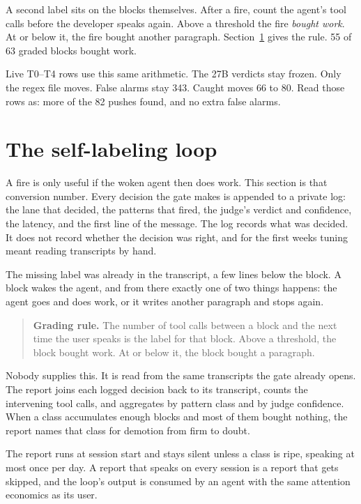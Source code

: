 A second label sits on the blocks themselves. After a fire, count
the agent's tool calls before the developer speaks again. Above a
threshold the fire \emph{bought work}. At or below it, the fire
bought another paragraph. Section~\ref{sec:loop} gives the rule.
55 of 63 graded blocks bought work.

Live T0--T4 rows use this same arithmetic. The 27B verdicts stay
frozen. Only the regex file moves. False alarms stay 343. Caught
moves 66 to 80. Read those rows as: more of the 82 pushes found,
and no extra false alarms.

\section{The self-labeling loop}
\label{sec:loop}

A fire is only useful if the woken agent then does work. This section is
that conversion number. Every decision the gate makes is appended to a
private log: the lane that decided, the patterns that fired, the judge's
verdict and confidence, the latency, and the first line of the message.
The log records what was decided. It does not record whether the decision
was right, and for the first weeks tuning meant reading transcripts by
hand.

The missing label was already in the transcript, a few lines below the block.
A block wakes the agent, and from there exactly one of two things happens: the
agent goes and does work, or it writes another paragraph and stops again.

\begin{quote}
\textbf{Grading rule.} The number of tool calls between a block and the next
time the user speaks is the label for that block. Above a threshold, the block
bought work. At or below it, the block bought a paragraph.
\end{quote}

Nobody supplies this. It is read from the same transcripts the gate already
opens. The report joins each logged decision back to its transcript, counts the
intervening tool calls, and aggregates by pattern class and by judge confidence.
When a class accumulates enough blocks and most of them bought nothing, the
report names that class for demotion from firm to doubt.

The report runs at session start and stays silent unless a class is ripe,
speaking at most once per day. A report that speaks on every session is a report
that gets skipped, and the loop's output is consumed by an agent with the same
attention economics as its user.

